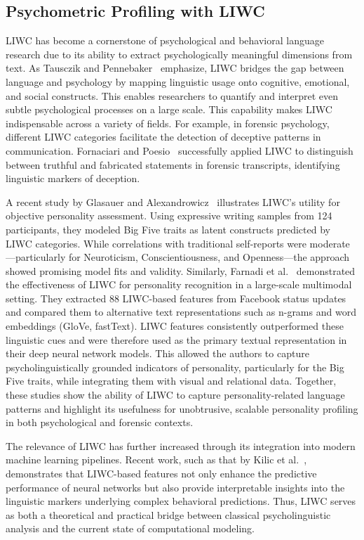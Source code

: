 \subsection{Psychometric Profiling with LIWC}

LIWC has become a cornerstone of psychological and behavioral language research due to its ability to extract psychologically meaningful dimensions from text. As Tausczik and Pennebaker~\cite{tausczik2010psychological} emphasize, LIWC bridges the gap between language and psychology by mapping linguistic usage onto cognitive, emotional, and social constructs. This enables researchers to quantify and interpret even subtle psychological processes on a large scale. This capability makes LIWC indispensable across a variety of fields. For example, in forensic psychology, different LIWC categories facilitate the detection of deceptive patterns in communication. Fornaciari and Poesio~\cite{fornaciari2013automatic} successfully applied LIWC to distinguish between truthful and fabricated statements in forensic transcripts, identifying linguistic markers of deception. %

A recent study by Glasauer and Alexandrowicz~\cite{glasauer2022bigfive} illustrates LIWC’s utility for objective personality assessment. Using expressive writing samples from 124 participants, they modeled Big Five traits as latent constructs predicted by LIWC categories. While correlations with traditional self-reports were moderate—particularly for Neuroticism, Conscientiousness, and Openness—the approach showed promising model fits and validity. Similarly, Farnadi et al.~\cite{farnadi2018user} demonstrated the effectiveness of LIWC for personality recognition in a large-scale multimodal setting. They extracted 88 LIWC-based features from Facebook status updates and compared them to alternative text representations such as n-grams and word embeddings (GloVe, fastText). LIWC features consistently outperformed these linguistic cues and were therefore used as the primary textual representation in their deep neural network models. This allowed the authors to capture  psycholinguistically grounded indicators of personality, particularly for the Big Five traits, while integrating them with visual and relational data. Together, these studies show the ability of LIWC to capture personality-related language patterns and highlight its usefulness for unobtrusive, scalable personality profiling in both psychological and forensic contexts. %

The relevance of LIWC has further increased through its integration into modern machine learning pipelines. Recent work, such as that by Kilic et al.~\cite{yakut-kilic-pan-2022-incorporating}, demonstrates that LIWC-based features not only enhance the predictive performance of neural networks but also provide interpretable insights into the linguistic markers underlying complex behavioral predictions. Thus, LIWC serves as both a theoretical and practical bridge between classical psycholinguistic analysis and the current state of computational modeling. %


